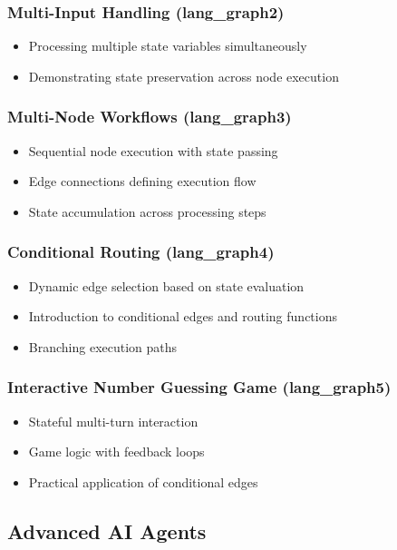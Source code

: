 \documentclass[12pt,a4paper]{article}
\begin{document}
\subsubsection{Multi-Input Handling (lang\_graph2)}
\begin{itemize}
    \item Processing multiple state variables simultaneously
    \item Demonstrating state preservation across node execution
\end{itemize}

\subsubsection{Multi-Node Workflows (lang\_graph3)}
\begin{itemize}
    \item Sequential node execution with state passing
    \item Edge connections defining execution flow
    \item State accumulation across processing steps
\end{itemize}

\subsubsection{Conditional Routing (lang\_graph4)}
\begin{itemize}
    \item Dynamic edge selection based on state evaluation
    \item Introduction to conditional edges and routing functions
    \item Branching execution paths
\end{itemize}

\subsubsection{Interactive Number Guessing Game (lang\_graph5)}
\begin{itemize}
    \item Stateful multi-turn interaction
    \item Game logic with feedback loops
    \item Practical application of conditional edges
\end{itemize}

\subsection{Advanced AI Agents}
\end{document}
